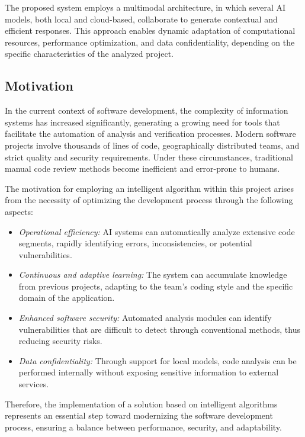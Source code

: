 \documentclass[12pt,a4paper]{article}
\begin{document}
The proposed system employs a multimodal architecture, in which several AI models, both local and cloud-based, 
collaborate to generate contextual and efficient responses. This approach enables dynamic adaptation of computational 
resources, performance optimization, and data confidentiality, depending on the specific characteristics of the analyzed 
project.

\subsection{Motivation}

In the current context of software development, the complexity of information systems has increased significantly, 
generating a growing need for tools that facilitate the automation of analysis and verification processes. Modern 
software projects involve thousands of lines of code, geographically distributed teams, and strict quality and security 
requirements. Under these circumstances, traditional manual code review methods become inefficient and error-prone to 
humans.

The motivation for employing an intelligent algorithm within this project arises from the necessity of optimizing the 
development process through the following aspects:

\begin{itemize}[leftmargin=1.5em]
    \item \textit{Operational efficiency:} AI systems can automatically analyze extensive code segments, rapidly 
    identifying errors, inconsistencies, or potential vulnerabilities.
    \item \textit{Continuous and adaptive learning:} The system can accumulate knowledge from previous projects, 
    adapting to the team’s coding style and the specific domain of the application.
    \item \textit{Enhanced software security:} Automated analysis modules can identify vulnerabilities that are 
    difficult to detect through conventional methods, thus reducing security risks.
    \item \textit{Data confidentiality:} Through support for local models, code analysis can be performed internally 
    without exposing sensitive information to external services.
\end{itemize}

Therefore, the implementation of a solution based on intelligent algorithms represents an essential step toward 
modernizing the software development process, ensuring a balance between performance, security, and adaptability.
\end{document}
